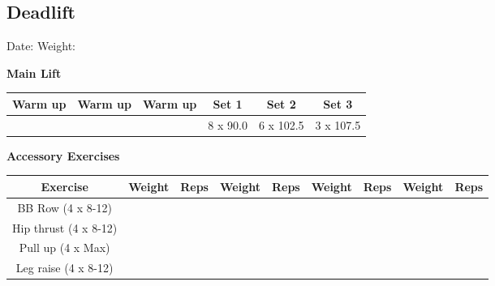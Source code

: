 \documentclass{article}%
\begin{document}
\subsection*{Deadlift}%
Date: %
\linebreak%
Weight: %
\vspace*{20pt}%
\linebreak%
\begin{minipage}{0.5\textwidth}%
\textbf{Main Lift\newline%
\newline%
}%
\begin{tabular}{|c|c|c|c|c|c|}%
\hline%
Warm up&Warm up&Warm up&Set 1&Set 2&Set 3\\%
\hline%
&&&8 x 90.0&6 x 102.5&3 x 107.5\\%
\hline%
\end{tabular}%
\vspace*{20pt}%
\linebreak%
\textbf{Accessory Exercises\newline%
\newline%
}%
\begin{tabular}{|c|c|c|c|c|c|c|c|c|}%
\hline%
Exercise&Weight&Reps&Weight&Reps&Weight&Reps&Weight&Reps\\%
\hline%
BB Row (4 x 8{-}12)&&&&&&&&\\%
\hline%
Hip thrust (4 x 8{-}12)&&&&&&&&\\%
\hline%
Pull up (4 x Max)&&&&&&&&\\%
\hline%
Leg raise (4 x 8{-}12)&&&&&&&&\\%
\hline%
\end{tabular}%
\end{minipage}%
\vspace*{20pt}%
\linebreak

%
\end{document}
